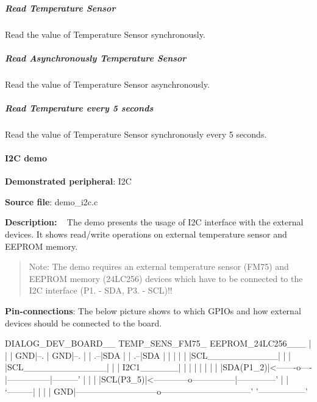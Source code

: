 \subparagraph*{Read Temperature Sensor}

Read the value of Temperature Sensor synchronously.

\subparagraph*{Read Asynchronously Temperature Sensor}

Read the value of Temperature Sensor asynchronously.

\subparagraph*{Read Temperature every 5 seconds}

Read the value of Temperature Sensor synchronously every 5 seconds.

\paragraph*{I2\+C demo}


\begin{DoxyItemize}
\item {\bfseries Demonstrated peripheral}\+: I2\+C
\item {\bfseries Source file}\+: demo\+\_\+i2c.\+c
\item {\bfseries Description\+:} ~\newline
 The demo presents the usage of I2\+C interface with the external devices. It shows read/write operations on external temperature sensor and E\+E\+P\+R\+O\+M memory.
\end{DoxyItemize}

\begin{quote}
Note\+: The demo requires an external temperature sensor (F\+M75) and E\+E\+P\+R\+O\+M memory (24\+L\+C256) devices which have to be connected to the I2\+C interface (P1. -\/ S\+D\+A, P3. -\/ S\+C\+L)!! \end{quote}



\begin{DoxyItemize}
\item {\bfseries Pin-\/connections}\+: The below picture shows to which G\+P\+I\+Os and how external devices should be connected to the board.
\end{DoxyItemize}


\begin{DoxyPre}
   DIALOG\_DEV\_BOARD\_\_            TEMP\_SENS\_FM75\_                EEPROM\_24LC256\_\_\_
   |                 |           |           GND|--.            |             GND|--.
   |                 |        .--|SDA           |  |         .--|SDA             |  |
   |                 |        |  |SCL\_\_\_\_\_\_\_\_\_\_\_|  |         |  |SCL\_\_\_\_\_\_\_\_\_\_\_\_\_|  |
   |       I2C1\_\_\_\_\_\_|        |    |               |         |    |                 |
   |       |SDA(P1\_2)|<-------o----|---------------|---------'    |                 |
   |       |SCL(P3\_5)|<------------o---------------|--------------'                 |
   |       `---------|                             |                                |
   |              GND|-----------------------------o--------------------------------'
   '-----------------'
\end{DoxyPre}



